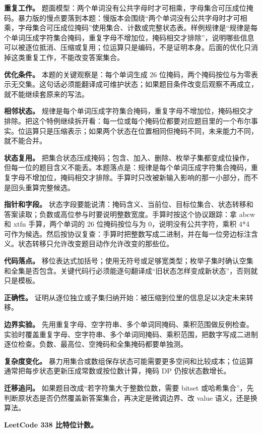 \textbf{重复工作。} 题面模型：两个单词没有公共字母时才可相乘，字母集合可压成位掩码。暴力版的慢点要落到本题：慢版本会围绕“两个单词没有公共字母时才可相乘，字母集合可压成位掩码”使用集合、计数或完整状态表。样例规律是“规律是每个单词压成字符集合掩码，重复字母不增加位，掩码相交才排除”，说明哪些信息可以被逐位抵消、压缩或复用；位运算只是编码，不是证明本身。后面的优化只消掉这类重复工作，不能改变答案集合。

\textbf{优化条件。} 本题的关键观察是：每个单词生成 26 位掩码，两个掩码按位与为零表示无交集。这句话必须能翻译成可维护状态；如果题目条件改变后观察不再成立，就不能继续套原来的写法。

\textbf{相邻状态。} 规律是每个单词压成字符集合掩码，重复字母不增加位，掩码相交才排除。把这个特例继续拆开看：每一位或每个掩码位都要对应题目里的一个布尔事实。位运算只是压缩表示；如果两个状态在位置相同但掩码不同，未来能力不同，就不能合并。

\textbf{状态复用。} 把集合状态压成掩码；包含、加入、删除、枚举子集都变成位操作，但每一位的题目含义不能丢。本题落点是：规律是每个单词压成字符集合掩码，重复字母不增加位，掩码相交才排除。手算时只改被新输入影响的那一小部分，而不是回头重算完整候选。

\textbf{指针和字段。} 状态字段要能说清：掩码含义、当前位、目标位集合、状态转移和答案读取；负数或高位参与时要说明整数宽度。手算时按这个协议跟踪：拿 abcw 和 xtfn 手算，两个单词的 26 位掩码按位与为 0，说明没有公共字符，乘积 4*4 可作为候选。然后按协议复查：手算时把整数写成二进制，并在每一位旁边标注含义。状态转移只允许改变题目动作允许改变的那些位。

\textbf{代码落点。} 移位表达式加括号；使用无符号或足够宽类型；枚举子集时确认空集和全集是否包含。关键代码行必须能逐句翻译成“旧状态怎样变成新状态”，否则就只是模板。

\textbf{正确性。} 证明从逐位独立或子集归纳开始：被压缩到位里的信息足以决定未来转移。

\textbf{边界实验。} 先用重复字母、空字符串、多个单词同掩码、乘积范围做反例检查。实验时覆盖重复字母、空字符串、多个单词同掩码、乘积范围，把数字写成二进制逐位检查。负数、最高位、空掩码和全集掩码都要单独测。

\textbf{复杂度变化。} 暴力用集合或数组保存状态可能需要更多空间和比较成本；位运算通常把每步状态更新压成常数或按位数计算，掩码 DP 仍按状态数增长。

\textbf{迁移追问。} 如果题目改成“若字符集大于整数位数，需要 bitset 或哈希集合”，先判断原状态是否仍然覆盖新答案集合，再决定是微调边界、改 value 语义，还是换算法。

\noindent\textbf{LeetCode 338 比特位计数。}

